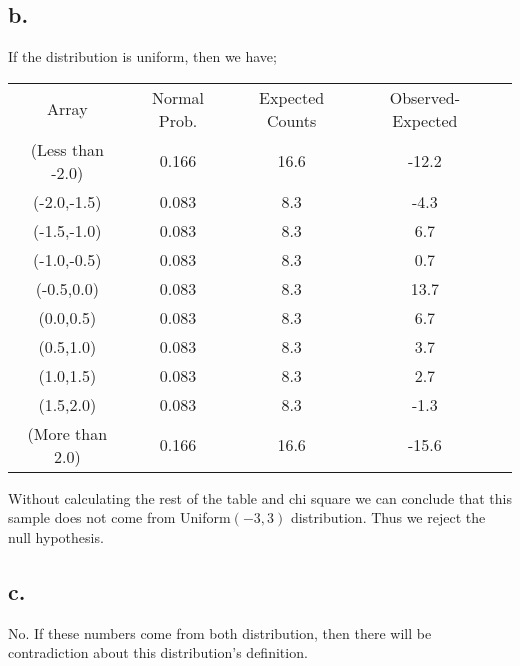 \documentclass[12pt]{article}
\begin{document}
\subsection*{b.}
If the distribution is uniform, then we have;

\begin{center}
\begin{tabular}{ c c c c c}
 Array & Normal Prob.& Expected Counts & Observed- Expected\\ 
 (Less than -2.0) & 0.166 & 16.6 & -12.2\\  
 (-2.0,-1.5) & 0.083 & 8.3 & -4.3\\  
 (-1.5,-1.0) & 0.083 & 8.3 & 6.7\\
 (-1.0,-0.5) & 0.083 & 8.3 & 0.7\\
 (-0.5,0.0) & 0.083 & 8.3 & 13.7\\
 (0.0,0.5) & 0.083 & 8.3 & 6.7\\
 (0.5,1.0) & 0.083 & 8.3 & 3.7\\
 (1.0,1.5) & 0.083 & 8.3 & 2.7\\
 (1.5,2.0) & 0.083 & 8.3 & -1.3\\
 (More than 2.0) & 0.166 & 16.6 & -15.6\\ 
\end{tabular}
\end{center}
Without calculating the rest of the table and chi square we can conclude that this sample does not come from Uniform$(-3,3)$ distribution. Thus we reject the null hypothesis.
\subsection*{c.}
No. If these numbers come from both distribution, then there will be contradiction about this distribution's definition.
\end{document}
